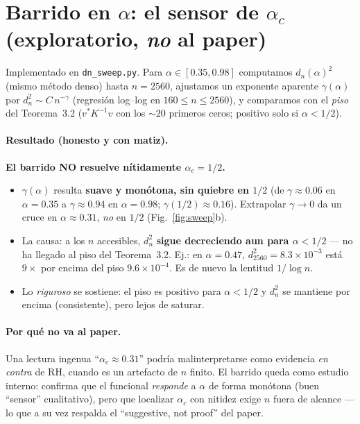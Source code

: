 \documentclass[11pt]{article}
\newcommand{\code}[1]{\texttt{#1}}
\begin{document}
\section{Barrido en $\alpha$: el sensor de $\alpha_c$ (exploratorio, \emph{no} al paper)}
\label{sec:sweep}

Implementado en \code{dn\_sweep.py}. Para $\alpha\in[0.35,0.98]$ computamos
$d_n(\alpha)^2$ (mismo m\'etodo denso) hasta $n=2560$, ajustamos un exponente aparente
$\gamma(\alpha)$ por $d_n^2\sim C\,n^{-\gamma}$ (regresi\'on log--log en $160\le n\le
2560$), y comparamos con el \emph{piso} del Teorema~3.2
($v^{*}K^{-1}v$ con los $\sim20$ primeros ceros; positivo solo si $\alpha<1/2$).

\paragraph{Resultado (honesto y con matiz).} \textbf{El barrido NO resuelve n\'itidamente
$\alpha_c=1/2$.}
\begin{itemize}[leftmargin=*]
  \item $\gamma(\alpha)$ resulta \textbf{suave y mon\'otona, sin quiebre en $1/2$}
        (de $\gamma\approx0.06$ en $\alpha=0.35$ a $\gamma\approx0.94$ en
        $\alpha=0.98$; $\gamma(1/2)\approx0.16$). Extrapolar $\gamma\to0$ da un cruce en
        $\alpha\approx0.31$, \emph{no} en $1/2$ (Fig.~\ref{fig:sweep}b).
  \item La causa: a los $n$ accesibles, $d_n^2$ \textbf{sigue decreciendo aun para
        $\alpha<1/2$} --- no ha llegado al piso del Teorema~3.2. Ej.: en $\alpha=0.47$,
        $d_{2560}^2=8.3\times10^{-3}$ est\'a $9\times$ por encima del piso
        $9.6\times10^{-4}$. Es de nuevo la lentitud $1/\log n$.
  \item Lo \emph{riguroso} se sostiene: el piso es positivo para $\alpha<1/2$ y $d_n^2$
        se mantiene por encima (consistente), pero lejos de saturar.
\end{itemize}

\paragraph{Por qu\'e no va al paper.} Una lectura ingenua ``$\alpha_c\approx0.31$''
podr\'ia malinterpretarse como evidencia \emph{en contra} de RH, cuando es un
artefacto de $n$ finito. El barrido queda como estudio interno: confirma que el
funcional \emph{responde} a $\alpha$ de forma mon\'otona (buen ``sensor'' cualitativo),
pero que localizar $\alpha_c$ con nitidez exige $n$ fuera de alcance --- lo que a su vez
respalda el ``suggestive, not proof'' del paper.
\end{document}
